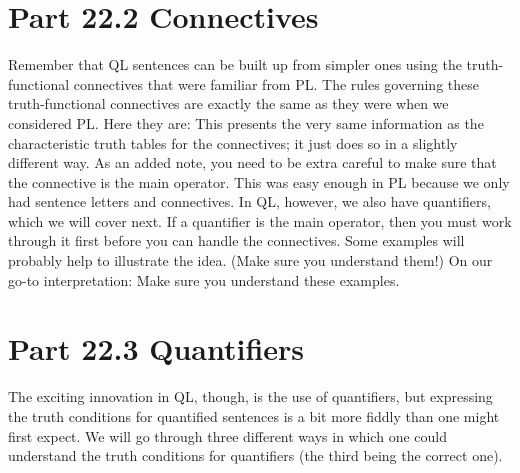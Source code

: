 \section{Part 22.2 Connectives}
Remember that QL sentences can be built up from simpler ones using the truth-functional connectives that were familiar from PL. The rules governing these truth-functional connectives are exactly the same as they were when we considered PL. Here they are:
This presents the very same information as the characteristic truth tables for the connectives; it just does so in a slightly different way. As an added note, you need to be extra careful to make sure that the connective is the main operator. This was easy enough in PL because we only had sentence letters and connectives. In QL, however, we also have quantifiers, which we will cover next. If a quantifier is the main operator, then you must work through it first before you can handle the connectives. Some examples will probably help to illustrate the idea. (Make sure you understand them!) On our go-to interpretation:
Make sure you understand these examples.
\section{Part 22.3 Quantifiers}
The exciting innovation in QL, though, is the use of quantifiers, but expressing the truth conditions for quantified sentences is a bit more fiddly than one might first expect. We will go through three different ways in which one could understand the truth conditions for quantifiers (the third being the correct one). 

